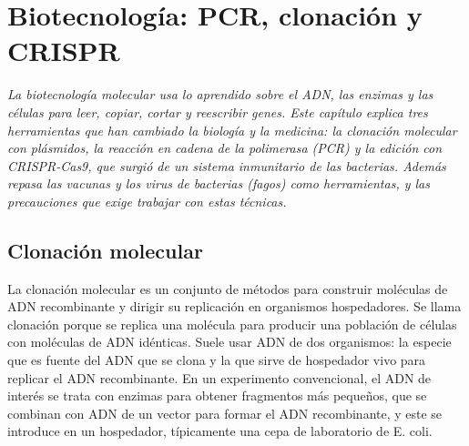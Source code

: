 \documentclass{book}
\begin{document}
\chapter{Biotecnología: PCR, clonación y CRISPR}
\label{chap:bio-11}

\noindent\textit{La biotecnología molecular usa lo aprendido sobre el ADN, las enzimas y las células para leer, copiar, cortar y reescribir genes. Este capítulo explica tres herramientas que han cambiado la biología y la medicina: la clonación molecular con plásmidos, la reacción en cadena de la polimerasa (PCR) y la edición con CRISPR-Cas9, que surgió de un sistema inmunitario de las bacterias. Además repasa las vacunas y los virus de bacterias (fagos) como herramientas, y las precauciones que exige trabajar con estas técnicas.}


\section{Clonación molecular}

La clonación molecular es un conjunto de métodos para construir moléculas de ADN recombinante y dirigir su replicación en organismos hospedadores. Se llama clonación porque se replica una molécula para producir una población de células con moléculas de ADN idénticas. Suele usar ADN de dos organismos: la especie que es fuente del ADN que se clona y la que sirve de hospedador vivo para replicar el ADN recombinante. En un experimento convencional, el ADN de interés se trata con enzimas para obtener fragmentos más pequeños, que se combinan con ADN de un vector para formar el ADN recombinante, y este se introduce en un hospedador, típicamente una cepa de laboratorio de E. coli.

\end{document}
